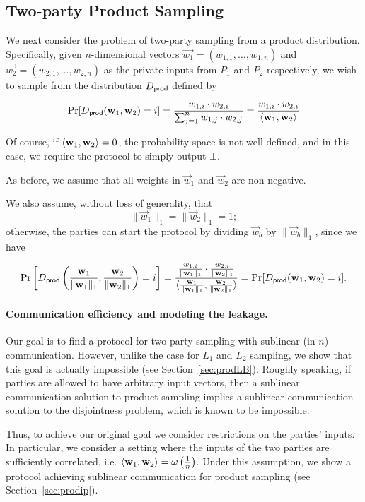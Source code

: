 \subsection{Two-party Product Sampling}
\label{sec:prod}
We next consider the problem of two-party sampling from a product
distribution.  Specifically, given $n$-dimensional vectors
$\vec{w_1}=(w_{1,1},\ldots,w_{1,n})$ and
$\vec{w_2}=(w_{2,1},\ldots,w_{2,n})$ as the private inputs from $P_1$
and $P_2$ respectively, we wish to sample from the distribution $D_{\mathsf{prod}}$
defined by

\[
\Pr[D_{\mathsf{prod}}(\mathbf{w}_1,\mathbf{w}_2)=i] = 
\frac{w_{1,i}\cdot w_{2,i}}{\sum_{j=1}^n w_{1,j} \cdot w_{2,j}} = 
\frac{w_{1,i} \cdot w_{2,i}}{\langle \mathbf{w}_1, \mathbf{w}_2 \rangle}
\]

Of course, if $\langle \mathbf{w}_1, \mathbf{w}_2 \rangle = 0$, the probability space is not well-defined, and
in this case, we require the protocol to simply output $\bot$. 

As before, we assume that all weights in $\vec{w}_1$ and $\vec{w}_2$ are
non-negative.

\iffalse
We also assume, without loss of generality, that $$\|
\vec{w}_1 \|_1 = \| \vec{w}_2 \|_1 = 1;$$ otherwise, the parties can
start the protocol by dividing $\vec{w}_b$ by $\|\vec{w}_b\|_1$, since
we have 

\[
\Pr\left[D_{\mathsf{prod}}\left(\frac{\mathbf{w}_1}{\|\mathbf{w}_1\|_1},\frac{\mathbf{w}_2}{\|\mathbf{w}_2\|_1}\right)=i\right] = 
\frac{ \frac{w_{1,i}}{\|\mathbf{w}_1\|_1} \cdot \frac{w_{2,i}}{\|\mathbf{w}_2\|_1}}{
  \langle \frac{\mathbf{w}_1}{\|\mathbf{w}_1\|_1}, \frac{\mathbf{w}_2}{\|\mathbf{w}_2\|_1}
   \rangle} = \Pr[D_{\mathsf{prod}}(\mathbf{w}_1,\mathbf{w}_2)=i].
\]

\paragraph{Communication efficiency and modeling the leakage.}
Our goal is to find a protocol for two-party sampling with sublinear (in
$n$) communication.  However, unlike the case for $L_1$ and $L_2$ sampling, we
show that this goal is actually impossible (see
Section~\ref{sec:prodLB}). Roughly speaking, if parties are allowed to
have arbitrary input vectors, then a sublinear communication solution to
product sampling implies a sublinear communication solution to the
disjointness problem, which is known to be impossible.

Thus, to achieve our original goal we consider restrictions on the
parties' inputs.  In particular, we consider a setting where the inputs
of the two parties are sufficiently correlated, i.e. $\langle \mathbf{w}_1, \mathbf{w}_2 \rangle =
\omega\left(\frac{1}{n}\right)$.  Under this assumption, we show a
protocol achieving sublinear communication for product sampling (see
Section~\ref{sec:prodip}).  


